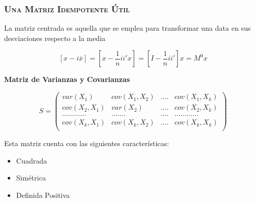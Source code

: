 \documentclass[16.5pt]{beamer}
\begin{document}
{
\begin{frame}
\frametitle{\textsc{\textbf{Una Matriz Idempotente Útil}}}
\hspace*{-5mm}
\vspace*{-5mm} 
\vspace{0.3cm}



  {\color{blue} La matriz centrada es aquella que se emplea para transformar una data en sus desviaciones respecto a la media}

$$[x -i\overline{x}] = [x - \frac{1}{n}ii'x] =  [I - \frac{1}{n}ii']x = M^0x$$

\textbf{Matriz de Varianzas y Covarianzas}

$$S= \begin{pmatrix} var(X_1) & cov(X_1, X_2) & .... & cov(X_1, X_k) \\
cov(X_2, X_1) & var(X_2) & .... & cov(X_2, X_k) \\
............  & .......   & .... & ............ \\
cov(X_k, X_1) & cov(X_k, X_2) & .... & cov(X_k, X_k) \\
\end{pmatrix}$$

 {\color{red}  Esta matriz cuenta con las siguientes características:}
\begin{itemize}
\item Cuadrada
\item Simétrica
\item Definida Positiva
\end{itemize}

\end{frame}
}
\end{document}
